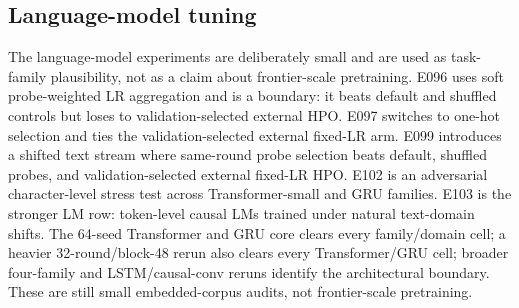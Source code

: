 \subsection{Language-model tuning}

The language-model experiments are deliberately small and are used as
task-family plausibility, not as a claim about frontier-scale pretraining.
E096 uses soft probe-weighted LR aggregation and is a boundary: it beats
default and shuffled controls but loses to validation-selected external HPO.
E097 switches to one-hot selection and ties the validation-selected external
fixed-LR arm. E099 introduces a shifted text stream where same-round probe
selection beats default, shuffled probes, and validation-selected external
fixed-LR HPO. E102 is an adversarial character-level stress test across
Transformer-small and GRU families. E103 is the stronger LM row: token-level
causal LMs trained under natural text-domain shifts. The 64-seed Transformer
and GRU core clears every family/domain cell; a heavier 32-round/block-48
rerun also clears every Transformer/GRU cell; broader four-family and
LSTM/causal-conv reruns identify the architectural boundary. These are still
small embedded-corpus audits, not frontier-scale pretraining.

